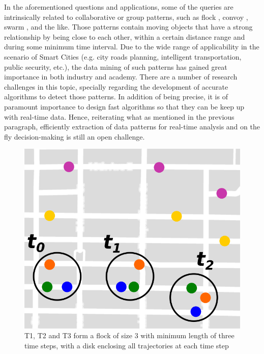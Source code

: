 In the aforementioned questions and applications, some of the queries are intrinsically related to collaborative or
group patterns, such as flock \citep{gudefficient}, convoy \citep{convoy}, swarm \citep{swarm}, and the like. Those
patterns contain moving objects that have a strong relationship by being close to each other, within a certain distance
range and during some minimum time interval. Due to the wide range of applicability in the scenario of Smart Cities
(e.g. city roads planning, intelligent transportation, public security, etc.), the data mining of such patterns has
gained great importance in both industry and academy. There are a number of research challenges in this topic, specially
regarding the development of accurate algorithms to detect those patterns. In addition of being precise, it is of
paramount importance to design fast algorithms so that they can be keep up with real-time data. Hence, reiterating what
as mentioned in the previous paragraph, efficiently extraction of data patterns for real-time analysis and on the fly
decision-making is still an open challenge.

\begin{figure}[h!]
    \centering
    \includegraphics[width=0.7\linewidth]{images/flock_pattern.png}
    \caption{T1, T2 and T3 form a flock of size 3 with minimum length of three time steps, with a disk enclosing all
        trajectories at each time step}
    \label{fig:flocks}
\end{figure}

